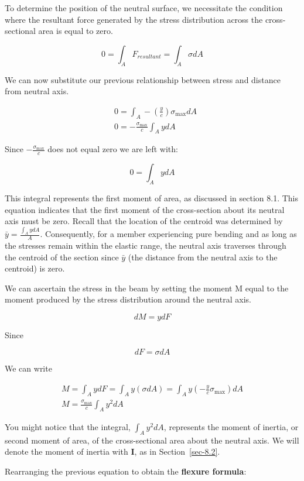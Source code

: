 \documentclass[
  letterpaper,
  DIV=11,
  numbers=noendperiod]{scrreprt}
\theoremstyle{definition}
\theoremstyle{remark}
\begin{document}
To determine the position of the neutral surface, we necessitate the
condition where the resultant force generated by the stress distribution
across the cross-sectional area is equal to zero.

\[
0=\int_A F_{resultant}=\int_A \sigma d A
\]

We can now substitute our previous relationship between stress and
distance from neutral axis.

\[
\begin{aligned}
& 0=\int_A-\left(\frac{y}{c}\right) \sigma_{\max } d A \\
& 0=-\frac{\sigma_{\max }}{c} \int_A y d A
\end{aligned}
\]

Since \(-\frac{\sigma_{\max }}{c}\) does not equal zero we are left
with:

\[
0=\int_A y d A
\]

This integral represents the first moment of area, as discussed in
section 8.1. This equation indicates that the first moment of the
cross-section about its neutral axis must be zero. Recall that the
location of the centroid was determined by
\(\bar{y}=\frac{\int_A y d A}{A}\). Consequently, for a member
experiencing pure bending and as long as the stresses remain within the
elastic range, the neutral axis traverses through the centroid of the
section since \(\bar{y}\) (the distance from the neutral axis to the
centroid) is zero.

We can ascertain the stress in the beam by setting the moment M equal to
the moment produced by the stress distribution around the neutral axis.

\[
d M=y d F
\]

Since

\[
d F=\sigma d A
\]

We can write

\[
\begin{gathered}
M=\int_A y d F=\int_A y(\sigma d A)=\int_A y\left(-\frac{y}{c} \sigma_{\max }\right) d A \\
M=\frac{\sigma_{\max }}{c} \int_A y^2 d A
\end{gathered}
\]

You might notice that the integral, \(\int_A y^2 d A\), represents the
moment of inertia, or second moment of area, of the cross-sectional area
about the neutral axis. We will denote the moment of inertia with
\textbf{I}, as in Section~\ref{sec-8.2}.

Rearranging the previous equation to obtain the \textbf{flexure
formula}:
\end{document}
